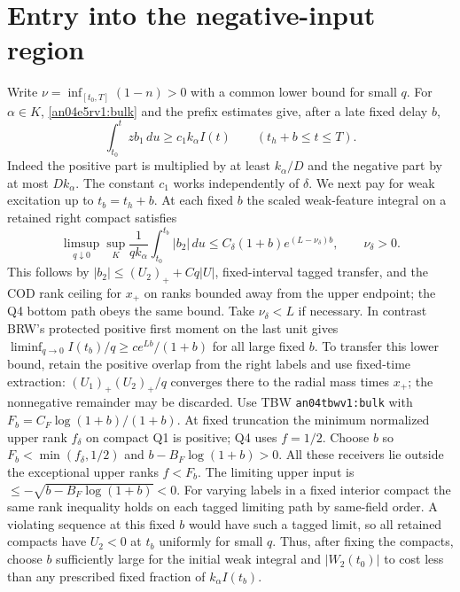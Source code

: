 \documentclass[11pt]{article}
\begin{document}
\section{Entry into the negative-input region}\label{an04e5rv1:entry}
Write $\nu=\inf_{[t_0,T]}(1-n)>0$ with a common lower bound for small
$q$. For $\alpha\in K$, \eqref{an04e5rv1:bulk} and the prefix estimates give,
after a late fixed delay $b$,
\[
 \int_{t_0}^t z b_1\,du\ge c_1 k_\alpha I(t)
 \qquad(t_h+b\le t\le T).
\]
Indeed the positive part is multiplied by at least $k_\alpha/D$ and
the negative part by at most $D k_\alpha$. The constant $c_1$ works
independently of $\delta$. We next pay for weak excitation up to
$t_b=t_h+b$. At each fixed $b$ the scaled weak-feature integral on a
retained right compact satisfies
\[
 \limsup_{q\downarrow0}\sup_K
 \frac{1}{q k_\alpha}\int_{t_0}^{t_b}|b_2|\,du
 \le C_\delta(1+b)e^{(L-\nu_\delta)b},\qquad \nu_\delta>0.
\]
This follows by $|b_2|\le (U_2)_++Cq|U|$, fixed-interval tagged
transfer, and the COD rank ceiling for $x_+$ on ranks bounded away from
the upper endpoint; the Q4 bottom path obeys the same bound. Take
$\nu_\delta<L$ if necessary. In contrast BRW's protected positive
first moment on the last unit gives
$\liminf_{q\to0} I(t_b)/q\ge c e^{Lb}/(1+b)$ for all large fixed $b$.
To transfer this lower bound, retain the positive overlap from the
right labels and use fixed-time extraction:
$(U_1)_+(U_2)_+/q$ converges there to the radial mass times $x_+$;
the nonnegative remainder may be discarded. Use TBW \texttt{an04tbwv1:bulk} with $F_b=C_F\log(1+b)/(1+b)$. At fixed truncation the minimum normalized upper rank $f_\delta$ on compact Q1 is positive; Q4 uses $f=1/2$. Choose $b$ so $F_b<\min(f_\delta,1/2)$ and $b-B_F\log(1+b)>0$. All these receivers lie outside the exceptional upper ranks $f<F_b$. The limiting upper input is $\le-\sqrt{b-B_F\log(1+b)}<0$. For varying labels in a fixed interior compact the same rank inequality holds on each tagged limiting path by same-field order. A violating sequence at this fixed $b$ would have such a tagged limit, so all retained compacts have $U_2<0$ at $t_b$ uniformly for small $q$.
Thus, after fixing the compacts, choose $b$ sufficiently large for
the initial weak integral and $|W_2(t_0)|$ to cost less than any
prescribed fixed fraction of $k_\alpha I(t_b)$.
\end{document}
